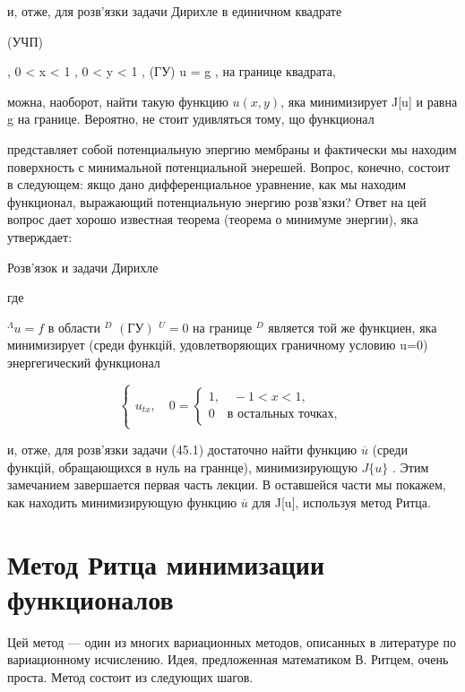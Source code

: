 \documentclass[
  ukrainian,
]{article}
\begin{document}
и, отже, для розв'язки задачи Дирихле в единичном квадрате

(УЧП)

, 0 \textless{} x \textless{} 1 , 0 \textless{} y \textless{} 1 , (ГУ) u
= g , на границе квадрата,

можна, наоборот, найти такую функцию \(u(x, y)\), яка минимизирует
J{[}u{]} и равна g на границе. Вероятно, не стоит удивляться тому, що
функционал

представляет собой потенциальную эпергию мембраны и фактически мы
находим поверхность с минимальной потенциальной энерешей. Вопрос,
конечно, состоит в следующем: якщо дано дифференциальное уравнение, как
мы находим функционал, выражающий потенциальную энергию розв'язки? Ответ
на цей вопрос дает хорошо известная теорема (теорема о минимуме
энергии), яка утверждает:

Розв'язок и задачи Дирихле

где

\(^{\Lambda}u = f\) в области \(^{D}\) \((ГУ)\) \(^{U}=0\) на границе
\(^{D}\) является той же функциен, яка минимизирует (среди функцій,
удовлетворяющих граничному условию u=0) энергегический функционал

\[
\begin{cases} u_{tx}, \quad 0 = \begin{cases} 1, \quad -1 < x < 1, \\ 0 \quad \text{в остальных точках,} \end{cases} \end{cases}
\]

и, отже, для розв'язки задачи (45.1) достаточно найти функцию
\(\overline{u}\) (среди функцій, обращающихся в нуль на граннце),
минимизирующую \(J\{u\}\) . Этим замечанием завершается первая часть
лекции. В оставшейся части мы покажем, как находить минимизирующую
функцию \(\overline{u}\) для J{[}u{]}, используя метод Ритца.

\section{Метод Ритца минимизации
функционалов}\label{ux43cux435ux442ux43eux434-ux440ux438ux442ux446ux430-ux43cux438ux43dux438ux43cux438ux437ux430ux446ux438ux438-ux444ux443ux43dux43aux446ux438ux43eux43dux430ux43bux43eux432}

Цей метод --- один из многих вариационных методов, описанных в
литературе по вариационному исчислению. Идея, предложенная математиком
В. Ритцем, очень проста. Метод состоит из следующих шагов.
\end{document}
